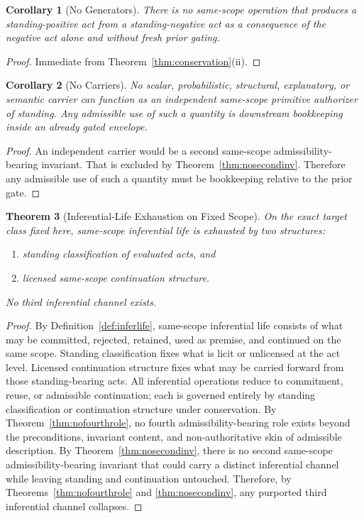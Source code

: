 \documentclass[11pt]{article}
\newtheorem{theorem}{Theorem}[section]
\newtheorem{corollary}[theorem]{Corollary}
\begin{document}
\begin{corollary}[No Generators]
\label{cor:nogenerators}
There is no same-scope operation that produces a standing-positive act from a standing-negative act as a consequence of the negative act alone and without fresh prior gating.
\end{corollary}

\begin{proof}
Immediate from Theorem~\ref{thm:conservation}(ii).
\end{proof}

\begin{corollary}[No Carriers]
\label{cor:nocarriers}
No scalar, probabilistic, structural, explanatory, or semantic carrier can function as an independent same-scope primitive authorizer of standing. Any admissible use of such a quantity is downstream bookkeeping inside an already gated envelope.
\end{corollary}

\begin{proof}
An independent carrier would be a second same-scope admissibility-bearing invariant. That is excluded by Theorem~\ref{thm:nosecondinv}. Therefore any admissible use of such a quantity must be bookkeeping relative to the prior gate.
\end{proof}

\begin{theorem}[Inferential-Life Exhaustion on Fixed Scope]
\label{thm:inferlifeexh}
On the exact target class fixed here, same-scope inferential life is exhausted by two structures:
\begin{enumerate}
\item[(i)] standing classification of evaluated acts, and
\item[(ii)] licensed same-scope continuation structure.
\end{enumerate}
No third inferential channel exists.
\end{theorem}

\begin{proof}
By Definition~\ref{def:inferlife}, same-scope inferential life consists of what may be committed, rejected, retained, used as premise, and continued on the same scope. Standing classification fixes what is licit or unlicensed at the act level. Licensed continuation structure fixes what may be carried forward from those standing-bearing acts. All inferential operations reduce to commitment, reuse, or admissible continuation; each is governed entirely by standing classification or continuation structure under conservation. By Theorem~\ref{thm:nofourthrole}, no fourth admissibility-bearing role exists beyond the preconditions, invariant content, and non-authoritative skin of admissible description. By Theorem~\ref{thm:nosecondinv}, there is no second same-scope admissibility-bearing invariant that could carry a distinct inferential channel while leaving standing and continuation untouched. Therefore, by Theorems~\ref{thm:nofourthrole} and \ref{thm:nosecondinv}, any purported third inferential channel collapses.
\end{proof}
\end{document}
